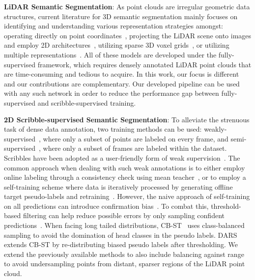 \documentclass[10pt,twocolumn,letterpaper]{article}
\begin{document}
\noindent \textbf{LiDAR Semantic Segmentation}:
As point clouds are irregular geometric data structures, current literature for 3D semantic segmentation mainly focuses on identifying and understanding various representation strategies amongst:
operating directly on point coordinates~\cite{cvpr2017pointnet, arxiv2017pointnet++, cvpr2020randla,iccv2019kpconv,wacv2021improving, eccv2020kprnet}, projecting the LiDAR scene onto images and employ 2D architectures~\cite{iros2019rangenet++,icra2018squeezeseg, icra2019squeezesegv2, eccv2020squeezesegv3, isvs2020salsanext, ral2020mininet}, utilizing sparse 3D voxel grids~\cite{eccv2020spvnas,cvpr2019minkowski,cvpr2021cylindrical,arxiv2020amvnet, arxiv2020sparse}, or utilizing multiple representations~\cite{arxiv2021rpvnet, eccv2020fusionnet,wacv2021multi}.
All of these models are developed under the fully-supervised framework, which requires densely annotated LiDAR point clouds that are time-consuming and tedious to acquire.
In this work, our focus is different and our contributions are complementary. Our developed pipeline can be used with any such network in order to reduce the performance gap between fully-supervised and scribble-supervised training.



\noindent \textbf{2D Scribble-supervised Semantic Segmentation}: 
To alleviate the strenuous task of dense data annotation, two training methods can be used: weakly-supervised~\cite{iccv2015constrained, cvpr2016scribblesup, miccai2020scribble2label, eccv2016seed, eccv2020weakly, nipsw2019scribble}, where only a subset of points are labeled on every frame, and semi-supervised~\cite{ipmi2019semi, dlmia2018deepsemi, iccv2021dars, nc2021semi}, where only a subset of frames are labeled within the dataset. Scribbles have been adopted as a user-friendly form of weak supervision~\cite{cvpr2016scribblesup}. The common approach when dealing with such weak annotations is to either employ online labeling through a consistency check using mean teacher~\cite{nips2017meanteacher,pr2022weakly,media2021weakly,iccv2021click, isbd2019wssmt}, or to employ a self-training scheme where data is iteratively processed by generating offline target pseudo-labels and retraining~\cite{cvpr2016scribblesup, dlmia2018medicalscribble, miccai2020scribble2label, tvcg2020scribble3d}. However, the naive approach of self-training on all predictions can introduce confirmation bias~\cite{ijcnn2020confirmationbias}. To combat this, threshold-based filtering can help reduce possible errors by only sampling confident predictions~\cite{aaai2020curriculum,cvpr2020selftraining, arxiv2020rethinking}. 
When facing long tailed distributions, CB-ST~\cite{eccv2018classbalanced} uses class-balanced sampling to avoid the domination of head classes in the pseudo labels. DARS~\cite{iccv2021dars} extends CB-ST by re-distributing biased pseudo labels after thresholding.
We extend the previously available methods to also include balancing against range to avoid undersampling points from distant, sparser regions of the LiDAR point cloud.
\end{document}
